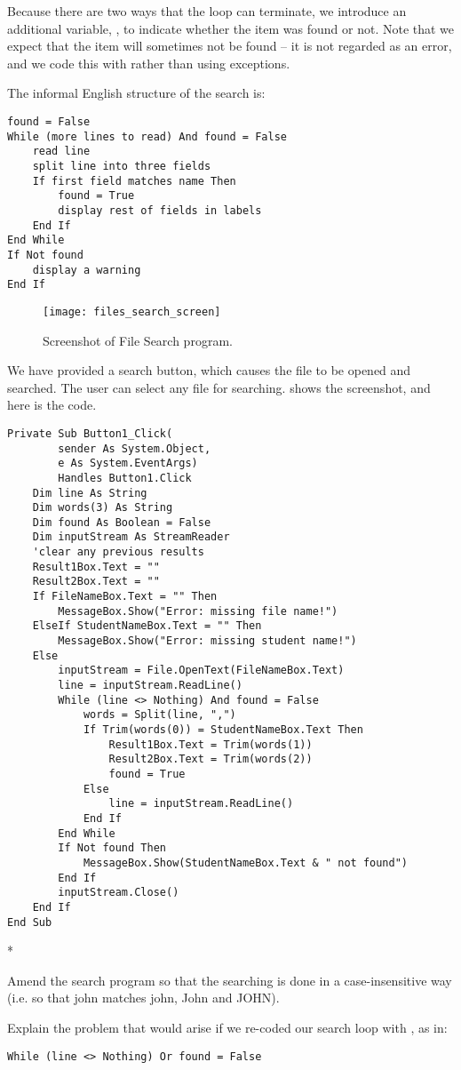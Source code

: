 		Because there are two ways that the loop can terminate, we introduce an additional variable, , to indicate whether the item was found or not. Note that we expect that the item will sometimes not be found – it is not regarded as an error, and we code this with  rather than using exceptions.

		The informal English structure of the search is:
		\begin{lstlisting}
found = False
While (more lines to read) And found = False
	read line
	split line into three fields
	If first field matches name Then
		found = True
		display rest of fields in labels
	End If
End While
If Not found
	display a warning
End If
		\end{lstlisting}
		\begin{figure}[tbh]
			\centering
			\texttt{[image: files\_search\_screen]}
			\caption{Screenshot of File Search program.}
			\label{fig:files_search_screen}
		\end{figure}
		We have provided a search button, which causes the file to be opened and searched. The user can select any file for searching.  shows the screenshot, and here is the code.
		\begin{lstlisting}
Private Sub Button1_Click(
		sender As System.Object,
		e As System.EventArgs)
		Handles Button1.Click
	Dim line As String
	Dim words(3) As String	
	Dim found As Boolean = False
	Dim inputStream As StreamReader
	'clear any previous results
	Result1Box.Text = ""
	Result2Box.Text = ""
	If FileNameBox.Text = "" Then
		MessageBox.Show("Error: missing file name!")
	ElseIf StudentNameBox.Text = "" Then
		MessageBox.Show("Error: missing student name!")
	Else
		inputStream = File.OpenText(FileNameBox.Text)
		line = inputStream.ReadLine()
		While (line <> Nothing) And found = False
			words = Split(line, ",")
			If Trim(words(0)) = StudentNameBox.Text Then
				Result1Box.Text = Trim(words(1))
				Result2Box.Text = Trim(words(2))
				found = True
			Else
				line = inputStream.ReadLine()
			End If
		End While
		If Not found Then
			MessageBox.Show(StudentNameBox.Text & " not found")
		End If
		inputStream.Close()
	End If
End Sub
		\end{lstlisting}

		\begin{stqb}*
			\begin{STQ}
				\item Amend the search program so that the searching is done in a case-insensitive way (i.e. so that john matches john, John and JOHN).
				\item	Explain the problem that would arise if we re-coded our search loop with , as in:
		\begin{lstlisting}
While (line <> Nothing) Or found = False
		\end{lstlisting}
			\end{STQ}
		\end{stqb}


